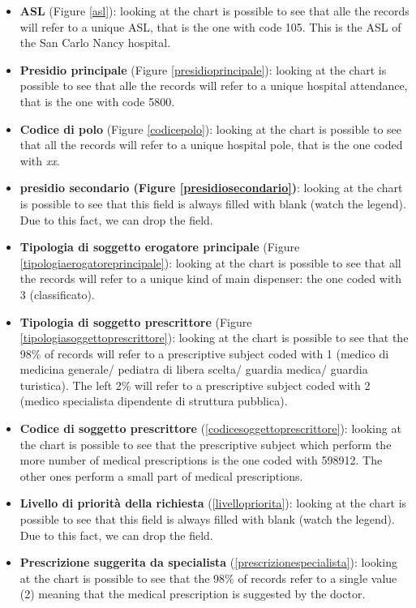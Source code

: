 \documentclass[paper=a4, fontsize=11pt]{scrartcl} %
\numberwithin{equation}{section} %
\numberwithin{figure}{section} %
\numberwithin{table}{section} %
\begin{document}
\begin{itemize}
\item \textbf{ASL} (Figure \ref{asl}): looking at the chart is possible to see that alle the records will refer to a unique ASL, that is the one with code 105. This is the ASL of the San Carlo Nancy hospital.
\item \textbf{Presidio principale} (Figure \ref{presidioprincipale}): looking at the chart is possible to see that alle the records will refer to a unique hospital attendance, that is the one with code 5800.
\item \textbf{Codice di polo} (Figure \ref{codicepolo}): looking at the chart is possible to see that all the records will refer to a unique hospital pole, that is the one coded with \textit{xx}.
\item \textbf{presidio secondario (Figure \ref{presidiosecondario})}: looking at the chart is possible to see that this field is always filled with blank (watch the legend). Due to this fact, we can drop the field.
\item \textbf{Tipologia di soggetto erogatore principale} (Figure \ref{tipologiaerogatoreprincipale}): looking at the chart is possible to see that all the records will refer to a unique kind of main dispenser: the one coded with 3 (classificato).
\item \textbf{Tipologia di soggetto prescrittore} (Figure \ref{tipologiasoggettoprescrittore}): looking at the chart is possible to see that the 98\% of records will refer to a prescriptive subject coded with 1 (medico di medicina generale/ pediatra di libera scelta/ guardia medica/ guardia turistica). The left 2\% will refer to a prescriptive subject coded with 2 (medico specialista dipendente di struttura pubblica).
\item \textbf{Codice di soggetto prescrittore} (\ref{codicesoggettoprescrittore}): looking at the chart is possible to see that the prescriptive subject which perform the more number of medical prescriptions is the one coded with 598912. The other ones perform a small part of medical prescriptions.
\item \textbf{Livello di priorità della richiesta} (\ref{livellopriorita}): looking at the chart is possible to see that this field is always filled with blank (watch the legend). Due to this fact, we can drop the field.
\item \textbf{Prescrizione suggerita da specialista} (\ref{prescrizionespecialista}): looking at the chart is possible to see that the 98\% of records refer to a single value (2) meaning that the medical prescription is suggested by the doctor.

\end{itemize}
\end{document}
